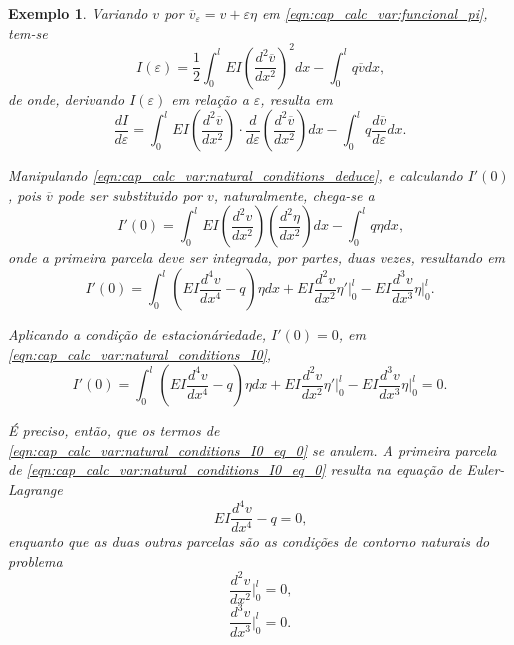 \documentclass[
	12pt,				%
	openright,			%
    twoside,			%
	a4paper,			%
	english,			%
	french,				%
	spanish,			%
	brazil				%
	]{abntex2}
\newtheorem{exemplo}{Exemplo}
\numberwithin{lema}{chapter}
\numberwithin{teorema}{chapter}
\numberwithin{definicao}{chapter}
\numberwithin{exemplo}{chapter}
\numberwithin{figure}{chapter}
\begin{document}
\begin{apendicesenv}
{\begin{exemplo}
		Variando $v$ por $\overline{v}_{\varepsilon}=v+\varepsilon \eta$ em \eqref{eqn:cap_calc_var:funcional_pi}, tem-se
		$$
			I(\varepsilon) = \frac{1}{2} \int_{0}^{l}
				EI \left (
					\frac{d^2\overline{v}}{dx^2}
				\right )^2 dx
				-
				\int_{0}^{l} q\overline{v} dx
				\text{,}
		$$
		de onde, derivando $I(\varepsilon)$ em relação a $\varepsilon$, resulta em
		\begin{equation}
			\label{eqn:cap_calc_var:natural_conditions_deduce}
			\frac{dI}{d\varepsilon} = 
				\int_{0}^{l} EI \left (
					\frac{d^2\overline{v}}{dx^2}
				\right ) \cdot 
				\frac{d}{d\varepsilon}\left (
					\frac{d^2\overline{v}}{dx^2}
				\right ) dx
				-
				\int_{0}^{l} q\frac{d\overline{v}}{d\varepsilon} dx
				\text{.}
		\end{equation}
		
		Manipulando \eqref{eqn:cap_calc_var:natural_conditions_deduce}, e calculando $I'(0)$, pois $\overline{v}$ pode ser substituido por $v$, naturalmente, chega-se a
		$$
			I'(0) = 
				\int_{0}^{l} EI \left (
					\frac{d^2v}{dx^2}
				\right ) \left (
					\frac{d^2\eta}{dx^2}
				\right ) dx
				-
				\int_{0}^{l}q\eta dx
			\text{,}
		$$
		onde a primeira parcela deve ser integrada, por partes, duas vezes, resultando em
		\begin{equation}
			\label{eqn:cap_calc_var:natural_conditions_I0}
			I'(0) = 
				\int_{0}^{l} \left (
					EI\frac{d^4 v}{dx^4}-q 
				\right ) \eta dx
				+
				EI\frac{d^2 v}{dx^2} \eta' \Big |_{0}^{l}
				-
				EI\frac{d^3 v}{dx^3} \eta \Big |_{0}^{l}
				\text{.}
		\end{equation}
		
		Aplicando a condição de estacionáriedade, $I'(0)=0$, em \eqref{eqn:cap_calc_var:natural_conditions_I0},
		\begin{equation}
			\label{eqn:cap_calc_var:natural_conditions_I0_eq_0}
			I'(0) = 
				\int_{0}^{l} \left (
					EI\frac{d^4 v}{dx^4}-q 
				\right ) \eta dx
				+
				EI\frac{d^2 v}{dx^2} \eta ' \Big |_{0}^{l}
				-
				EI\frac{d^3 v}{dx^3} \eta \Big |_{0}^{l}
				= 0
				\text{.}
		\end{equation}
	
		É preciso, então, que os termos de \eqref{eqn:cap_calc_var:natural_conditions_I0_eq_0} se anulem. A primeira parcela de \eqref{eqn:cap_calc_var:natural_conditions_I0_eq_0} resulta na equação de Euler-Lagrange
		\begin{equation}
			\label{eqn:cap_calc_var:natural_eq_euler_lagr}
			EI\frac{d^4v}{dx^4} - q = 0
			\text{,}
		\end{equation}
		enquanto que as duas outras parcelas são as condições de contorno naturais do problema
		\begin{equation}
			\label{eqn:cap_calc_var:natural_cond1}
			\frac{d^2 v}{dx^2}\Big |_{0}^{l} = 0
			\text{,}
		\end{equation}
		\begin{equation}
			\label{eqn:cap_calc_var:natural_cond2}
			\frac{d^3 v}{dx^3}\Big |_{0}^{l} = 0
			\text{.}
		\end{equation}
	

\end{exemplo}}
\end{apendicesenv}
\end{document}
